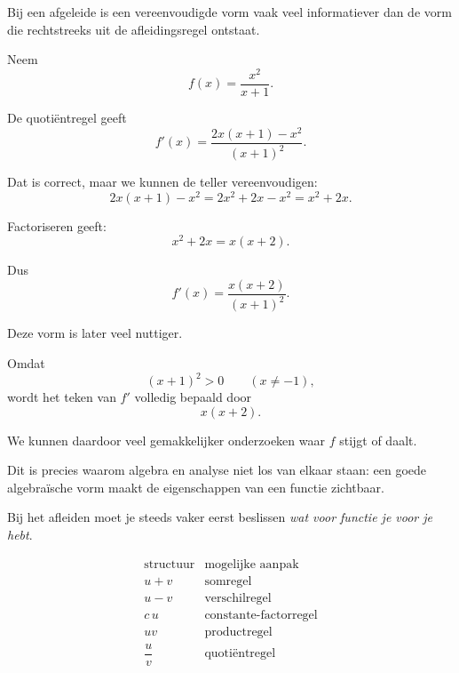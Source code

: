 \documentclass{ximera}
\begin{document}


Bij een afgeleide is een vereenvoudigde vorm vaak veel informatiever dan
de vorm die rechtstreeks uit de afleidingsregel ontstaat.

\begin{voorbeeld}
Neem
\[
f(x)=\frac{x^2}{x+1}.
\]

De quotiëntregel geeft
\[
f'(x)
=
\frac{2x(x+1)-x^2}{(x+1)^2}.
\]

Dat is correct, maar we kunnen de teller vereenvoudigen:
\[
2x(x+1)-x^2
=
2x^2+2x-x^2
=
x^2+2x.
\]

Factoriseren geeft:
\[
x^2+2x=x(x+2).
\]

Dus
\[
\boxed{
f'(x)=\frac{x(x+2)}{(x+1)^2}.
}
\]

Deze vorm is later veel nuttiger.

Omdat
\[
(x+1)^2>0
\qquad (x\neq-1),
\]
wordt het teken van $f'$ volledig bepaald door
\[
x(x+2).
\]

We kunnen daardoor veel gemakkelijker onderzoeken waar $f$ stijgt of
daalt.
\end{voorbeeld}

Dit is precies waarom algebra en analyse niet los van elkaar staan:
een goede algebraïsche vorm maakt de eigenschappen van een functie
zichtbaar.








Bij het afleiden moet je steeds vaker eerst beslissen \emph{wat voor
functie je voor je hebt}.

\begin{center}
\[
\begin{array}{c|c}
\text{structuur} & \text{mogelijke aanpak}\\
\hline
u+v & \text{somregel}\\[1mm]
u-v & \text{verschilregel}\\[1mm]
c\,u & \text{constante-factorregel}\\[1mm]
uv & \text{productregel}\\[1mm]
\dfrac{u}{v} & \text{quotiëntregel}\\
\end{array}
\]
\end{center}
\end{document}
